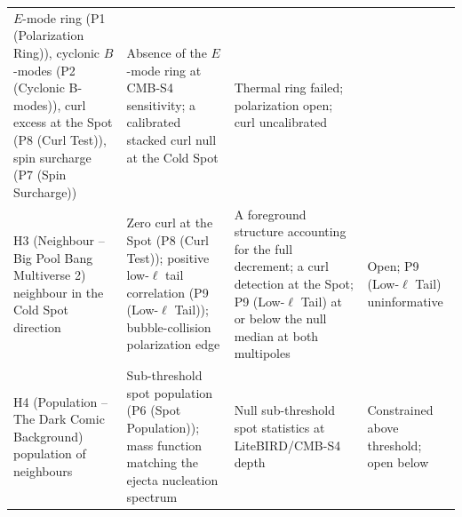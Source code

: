 \documentclass[
  11pt,
]{article}
\begin{document}
\begin{longtable}[]{@{}llll@{}}
\begin{minipage}[t]{0.22\columnwidth}
\(E\)-mode ring (P1 (Polarization Ring)), cyclonic \(B\)-modes (P2
(Cyclonic B-modes)), curl excess at the Spot (P8 (Curl Test)), spin
surcharge (P7 (Spin Surcharge))\strut
\end{minipage} & \begin{minipage}[t]{0.22\columnwidth}\raggedright
Absence of the \(E\)-mode ring at CMB-S4 sensitivity; a calibrated
stacked curl null at the Cold Spot\strut
\end{minipage} & \begin{minipage}[t]{0.22\columnwidth}\raggedright
Thermal ring failed; polarization open; curl uncalibrated\strut
\end{minipage}\tabularnewline
\begin{minipage}[t]{0.22\columnwidth}\raggedright
H3 (Neighbour -- Big Pool Bang Multiverse 2) neighbour in the Cold Spot
direction\strut
\end{minipage} & \begin{minipage}[t]{0.22\columnwidth}\raggedright
Zero curl at the Spot (P8 (Curl Test)); positive low-\(\ell\) tail
correlation (P9 (Low-\(\ell\) Tail)); bubble-collision polarization
edge\strut
\end{minipage} & \begin{minipage}[t]{0.22\columnwidth}\raggedright
A foreground structure accounting for the full decrement; a curl
detection at the Spot; P9 (Low-\(\ell\) Tail) at or below the null
median at both multipoles\strut
\end{minipage} & \begin{minipage}[t]{0.22\columnwidth}\raggedright
Open; P9 (Low-\(\ell\) Tail) uninformative\strut
\end{minipage}\tabularnewline
\begin{minipage}[t]{0.22\columnwidth}\raggedright
H4 (Population -- The Dark Comic Background) population of
neighbours\strut
\end{minipage} & \begin{minipage}[t]{0.22\columnwidth}\raggedright
Sub-threshold spot population (P6 (Spot Population)); mass function
matching the ejecta nucleation spectrum\strut
\end{minipage} & \begin{minipage}[t]{0.22\columnwidth}\raggedright
Null sub-threshold spot statistics at LiteBIRD/CMB-S4 depth\strut
\end{minipage} & \begin{minipage}[t]{0.22\columnwidth}\raggedright
Constrained above threshold; open below\strut
\end{minipage}\tabularnewline

\end{longtable}
\end{document}
